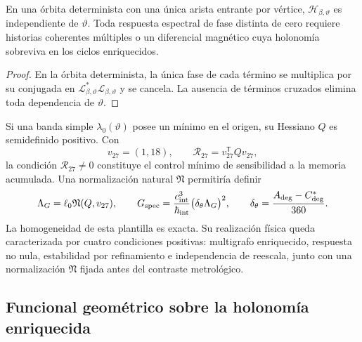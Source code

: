 \begin{proposition}
\label{prop:interferencia-selector-G-rev11}
En una órbita determinista con una única arista entrante por vértice,
\(\mathcal H_{\beta,\vartheta}\) es independiente de \(\vartheta\). Toda
respuesta espectral de fase distinta de cero requiere historias coherentes
múltiples o un diferencial magnético cuya holonomía sobreviva en los ciclos
enriquecidos.
\end{proposition}

\begin{proof}
En la órbita determinista, la única fase de cada término se multiplica por su
conjugada en
\(\mathcal L_{\beta,\vartheta}^{*}\mathcal L_{\beta,\vartheta}\)
y se cancela. La ausencia de términos cruzados elimina toda dependencia de
\(\vartheta\).
\end{proof}

Si una banda simple \(\lambda_0(\vartheta)\) posee un mínimo en el origen,
su Hessiano \(Q\) es semidefinido positivo. Con
\[
 v_{27}=(1,18),
 \qquad
 \mathcal R_{27}=v_{27}^{\mathsf T}Qv_{27},
\]
la condición \(\mathcal R_{27}\neq0\) constituye el control mínimo de
sensibilidad a la memoria acumulada. Una normalización natural
\(\mathfrak N\) permitiría definir
\[
 \Lambda_G=\ell_0\mathfrak N(Q,v_{27}),
 \qquad
 G_{\rm spec}
 =\frac{c_{\rm int}^{3}}{\hbar_{\rm int}}
  \bigl(\delta_\theta\Lambda_G\bigr)^2,
 \qquad
 \delta_\theta=\frac{A_{\rm deg}-C_{\rm deg}^{\ast}}{360}.
\]
La homogeneidad de esta plantilla es exacta. Su realización física queda
caracterizada por cuatro condiciones positivas: multigrafo enriquecido,
respuesta no nula, estabilidad por refinamiento e independencia de reescala,
junto con una normalización \(\mathfrak N\) fijada antes del contraste
metrológico.

\subsection{Funcional geométrico sobre la holonomía enriquecida}

